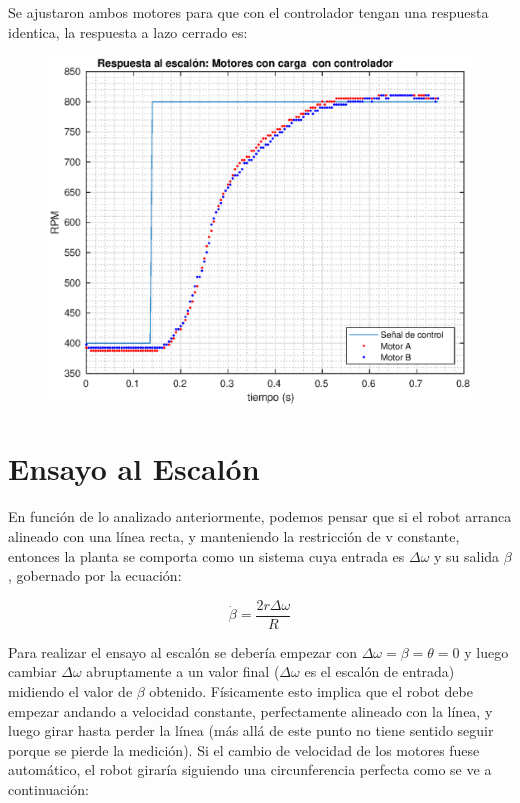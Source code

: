 \documentclass[10pt,conference,a4paper,onecolumn]{article}%
\begin{document}
Se ajustaron ambos motores para que con el controlador tengan una respuesta identica, la respuesta a lazo cerrado es:
\begin{figure}[h]
\centering
\includegraphics[width=15cm]{./imagenes/resp_escalon_motores_controlados_2}
\end{figure}

\section{Ensayo al Escalón}

En función de lo analizado anteriormente, podemos pensar que si el robot arranca alineado con una línea recta, y manteniendo la restricción de v constante, entonces la planta se comporta como un sistema cuya entrada es $\Delta \omega$ y su salida $\beta $, gobernado por la ecuación:

\begin{equation}
\dot{\beta}= \frac{2r\Delta\omega}{R} 
\label{eq:sys_tot_teo} 
\end{equation}

Para realizar el ensayo al escalón se debería empezar con $\Delta \omega = \beta = \theta=0$  y luego cambiar $\Delta \omega$  abruptamente a un valor final ($\Delta \omega$  es el escalón de entrada) midiendo el valor de $\beta$ obtenido. Físicamente esto implica que el robot debe empezar andando a velocidad constante, perfectamente alineado con la línea, y luego girar hasta perder la línea (más allá de este punto no tiene sentido seguir porque se pierde la medición).
Si el cambio de velocidad de los motores fuese automático, el robot giraría siguiendo una circunferencia perfecta como se ve a continuación:
\end{document}
